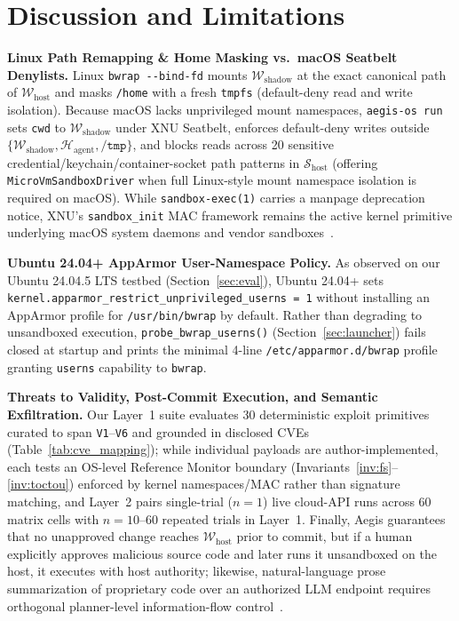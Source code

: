 \documentclass[10pt,journal,compsoc]{IEEEtran}
\begin{document}
\section{Discussion and Limitations}
\label{sec:discussion}

\noindent\textbf{Linux Path Remapping \& Home Masking vs.\ macOS Seatbelt Denylists.}
Linux \texttt{bwrap -\/-bind-fd} mounts $\mathcal{W}_{\text{shadow}}$ at the exact canonical path of $\mathcal{W}_{\text{host}}$ and masks \texttt{/home} with a fresh \texttt{tmpfs} (default-deny read and write isolation). Because macOS lacks unprivileged mount namespaces, \texttt{aegis-os run} sets \texttt{cwd} to $\mathcal{W}_{\text{shadow}}$ under XNU Seatbelt, enforces default-deny writes outside $\{\mathcal{W}_{\text{shadow}}, \mathcal{H}_{\text{agent}}, \texttt{/tmp}\}$, and blocks reads across 20 sensitive credential/keychain/container-socket path patterns in $\mathcal{S}_{\text{host}}$ (offering \texttt{MicroVmSandboxDriver} when full Linux-style mount namespace isolation is required on macOS). While \texttt{sandbox-exec(1)} carries a manpage deprecation notice, XNU's \texttt{sandbox\_init} MAC framework remains the active kernel primitive underlying macOS system daemons and vendor sandboxes~\cite{anthropic2025srt,openai2025codex}.

\noindent\textbf{Ubuntu 24.04+ AppArmor User-Namespace Policy.}
As observed on our Ubuntu 24.04.5 LTS testbed (Section~\ref{sec:eval}), Ubuntu 24.04+ sets \texttt{kernel.apparmor\_restrict\_unprivileged\_userns = 1} without installing an AppArmor profile for \texttt{/usr/bin/bwrap} by default. Rather than degrading to unsandboxed execution, \texttt{probe\_bwrap\_userns()} (Section~\ref{sec:launcher}) fails closed at startup and prints the minimal 4-line \texttt{/etc/apparmor.d/bwrap} profile granting \texttt{userns} capability to \texttt{bwrap}.

\noindent\textbf{Threats to Validity, Post-Commit Execution, and Semantic Exfiltration.}
Our Layer~1 suite evaluates 30 deterministic exploit primitives curated to span \texttt{V1}--\texttt{V6} and grounded in disclosed CVEs (Table~\ref{tab:cve_mapping}); while individual payloads are author-implemented, each tests an OS-level Reference Monitor boundary (Invariants~\ref{inv:fs}--\ref{inv:toctou}) enforced by kernel namespaces/MAC rather than signature matching, and Layer~2 pairs single-trial ($n=1$) live cloud-API runs across 60 matrix cells with $n=10\text{--}60$ repeated trials in Layer~1. Finally, Aegis guarantees that no unapproved change reaches $\mathcal{W}_{\text{host}}$ prior to commit, but if a human explicitly approves malicious source code and later runs it unsandboxed on the host, it executes with host authority; likewise, natural-language prose summarization of proprietary code over an authorized LLM endpoint requires orthogonal planner-level information-flow control~\cite{debenedetti2025camel,costa2025fides}.
\end{document}
